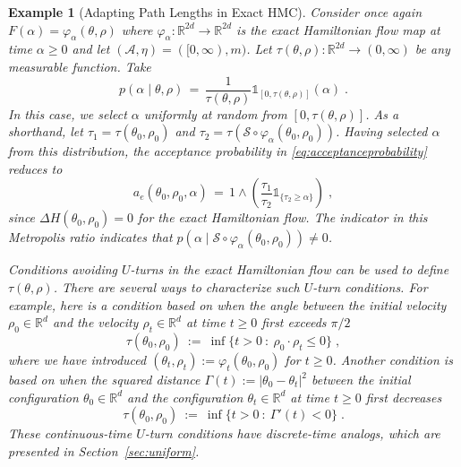 \documentclass[ejs]{imsart}
\theoremstyle{plain}%
\newtheorem{example}[prototheorem]{Example}
\theoremstyle{remark}
\begin{document}
\begin{example}[Adapting Path Lengths in Exact HMC]
Consider once again $F(\alpha) = \varphi_\alpha(\theta, \rho)$ where  $\varphi_{\alpha}: \mathbb{R}^{2d} \to \mathbb{R}^{2d}$ is the exact Hamiltonian flow map at time $\alpha \ge 0$ and let $(\mathcal{A}, \eta) = ([0, \infty), m)$. Let $\tau(\theta, \rho):\mathbb{R}^{2d} \to (0, \infty)$ be any measurable function.  Take \[ p(\alpha \mid \theta, \rho) \, = \,  \dfrac{1}{\tau(\theta, \rho)} \mathds{1}_{[0,\tau(\theta, \rho)]}( \alpha ) \;.
\] In this case, we select $\alpha$ uniformly at random from  $[0,\tau(\theta, \rho)]$. 
As a shorthand, let $\tau_1 = \tau(\theta_0, \rho_0)$ and $\tau_2 = \tau(\mathcal{S} \circ \varphi_{\alpha}(\theta_0, \rho_0))$.
Having selected $\alpha$ from this distribution, the acceptance probability in \eqref{eq:acceptanceprobability} reduces to \[ a_e(\theta_0, \rho_0, \alpha) \, = \, 1 \wedge \left( \frac{\tau_1}{\tau_2} \mathds{1}_{ \{  \tau_2 \geq \alpha \} } \right) \;, \] since $\Delta H(\theta_0, \rho_0) = 0$ for the exact Hamiltonian flow.  The indicator in this Metropolis ratio indicates that  $p(\alpha \mid \mathcal{S} \circ \varphi_{\alpha}(\theta_0, \rho_0)) \ne 0$.


Conditions avoiding $U$-turns in the exact Hamiltonian flow can be used to define $\tau(\theta, \rho)$.  There are several ways to characterize such $U$-turn conditions. For example, here is a condition based on when the angle between the initial velocity $\rho_0 \in \mathbb{R}^d$ and the velocity $\rho_t \in \mathbb{R}^d$ at time $t \ge 0$ first exceeds $\pi/2$ \begin{equation} \label{eq:ct_angle}
\tau(\theta_0, \rho_0) \ := \ \inf\{ t > 0 ~:~ \rho_0 \cdot \rho_t \le 0 \} \;,
\end{equation} where we have introduced $(\theta_t, \rho_t) := \varphi_t(\theta_0, \rho_0)$ for $t \ge 0$.  Another condition is based on when the squared distance $\Gamma(t) := | \theta_0 - \theta_t|^2$ between the initial configuration $\theta_0 \in \mathbb{R}^d$ and the configuration $\theta_t \in \mathbb{R}^d$ at time $t \ge 0$ first decreases \begin{equation} \label{eq:ct_dist}
\tau(\theta_0, \rho_0) \ := \ \inf\{ t > 0 ~:~ \Gamma'(t) < 0 \} \;.
\end{equation}
These continuous-time $U$-turn conditions have discrete-time analogs, which are presented in Section~\ref{sec:uniform}.
\end{example}
\end{document}
